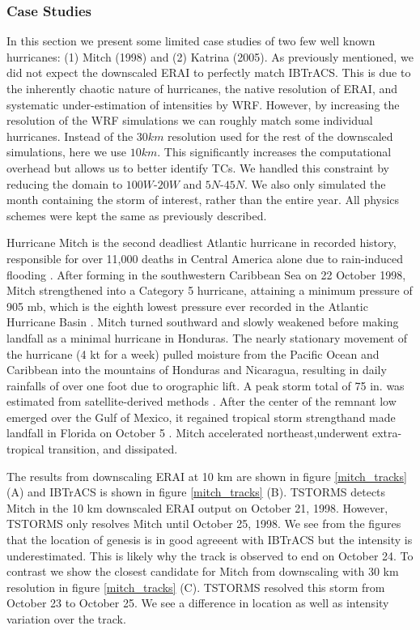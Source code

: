 \subsubsection{Case Studies}
\label{cases}
In this section we present some limited case studies of two few well known hurricanes: (1) Mitch (1998) and (2) Katrina (2005). As previously mentioned, we did not expect the downscaled ERAI to perfectly match IBTrACS. This is due to the inherently chaotic nature of hurricanes, the native resolution of ERAI, and systematic under-estimation of intensities by WRF. However, by increasing the resolution of the WRF simulations we can roughly match some individual hurricanes. Instead of the $30 km$ resolution used for the rest of the downscaled simulations, here we use $10 km$. This significantly increases the computational overhead but allows us to better identify TCs. We handled this constraint by reducing the domain to $100 W$-$20 W$ and $5 N$-$45 N$. We also only simulated the month containing the storm of interest, rather than the entire year. All physics schemes were kept the same as previously described. 

Hurricane Mitch is the second deadliest Atlantic hurricane in recorded history, responsible for over 11,000 deaths in Central America alone due to rain-induced flooding \cite{hellin}.  After forming in the southwestern Caribbean Sea on 22 October 1998, Mitch strengthened into a Category 5 hurricane, attaining a minimum pressure of 905 mb, which is the eighth lowest pressure ever recorded in the Atlantic Hurricane Basin \cite{pasch}.  Mitch turned southward and slowly weakened before making landfall as a minimal hurricane in Honduras.  The nearly stationary movement of the hurricane (4 kt for a week) pulled moisture from the Pacific Ocean and Caribbean into the mountains of Honduras and Nicaragua, resulting in daily rainfalls of over one foot due to orographic lift.  A peak storm total of 75 in. was estimated from satellite-derived methods \cite{hellin}.  After the center of the remnant low emerged over the Gulf of Mexico, it regained tropical storm strengthand made landfall in Florida on October 5 \cite{pasch}.  Mitch accelerated northeast,underwent extra-tropical transition, and dissipated.
\par
The results from downscaling ERAI at 10 km are shown in figure \ref{mitch_tracks} (A) and IBTrACS is shown in figure \ref{mitch_tracks} (B). TSTORMS detects Mitch in the 10 km downscaled ERAI output on October 21, 1998. However, TSTORMS only resolves Mitch until October 25, 1998. We see from the figures that the location of genesis is in good agreeent with IBTrACS but the intensity is underestimated. This is likely why the track is observed to end on October 24. To contrast we show the closest candidate for Mitch from downscaling with 30 km resolution in figure \ref{mitch_tracks} (C). TSTORMS resolved this storm from October 23 to October 25. We see a difference in location as well as intensity variation over the track.  

